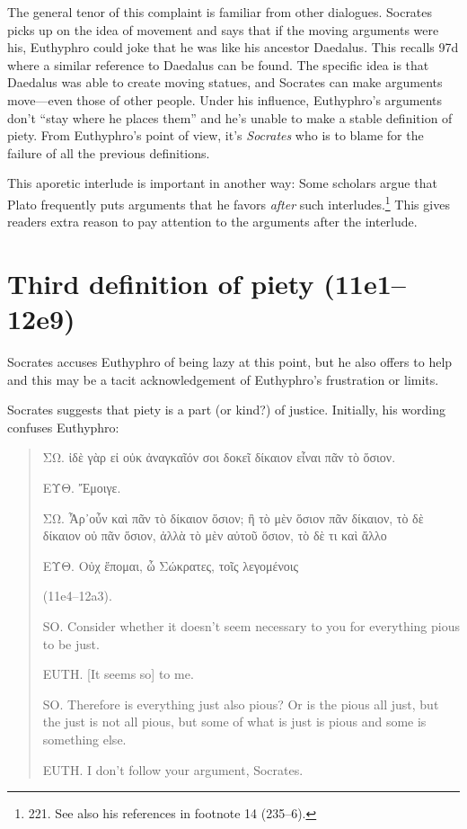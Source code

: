 \documentclass[11pt]{article}
\begin{document}
The general tenor of this complaint is familiar from other dialogues.  Socrates picks up on the idea of movement and says that if the moving arguments were his, Euthyphro could joke that he was like his ancestor Daedalus.  This recalls  97d where a similar reference to Daedalus can be found.  The specific idea is that Daedalus was able to create moving statues, and Socrates can make arguments move---even those of other people.  Under his influence, Euthyphro's arguments don't ``stay where he places them'' and he's unable to make a stable definition of piety.  From Euthyphro's point of view, it's \emph{Socrates} who is to blame for the failure of all the previous definitions.

This aporetic interlude is important in another way: Some scholars argue that Plato frequently puts arguments that he favors \emph{after} such interludes.\footnote{\citet{mcpherran1992} 221.  See also his references in footnote 14 (235--6).}  This gives readers extra reason to pay attention to the arguments after the interlude.


\section{Third definition of piety (11e1--12e9)}

Socrates accuses Euthyphro of being lazy at this point, but he also offers to help and this may be a tacit acknowledgement of Euthyphro's frustration or limits.

Socrates suggests that piety is a part (or kind?) of justice.  Initially, his wording confuses Euthyphro:

\begin{quote}

    {\g
    ΣΩ. ἰδὲ γὰρ εἰ οὐκ ἀναγκαῖόν σοι δοκεῖ δίκαιον εἶναι πᾶν τὸ ὅσιον.

    ΕΥΘ. Ἔμοιγε.

    ΣΩ. Ἆρ᾽οὖν καὶ πᾶν τὸ δίκαιον ὅσιον; ἢ τὸ μὲν ὅσιον πᾶν δίκαιον, τὸ δὲ δίκαιον οὐ πᾶν ὅσιον, ἀλλὰ τὸ μὲν αὐτοῦ ὅσιον, τὸ δὲ τι καὶ ἄλλο

    ΕΥΘ. Οὐχ ἕπομαι, ὦ Σώκρατες, τοῖς λεγομένοις
    } (11e4--12a3).

    SO. Consider whether it doesn't seem necessary to you for everything pious to be just.

    EUTH. [It seems so] to me.

    SO. Therefore is everything just also pious? Or is the pious all just, but the just is not all pious, but some of what is just is pious and some is something else.

    EUTH. I don't follow your argument, Socrates.

\end{quote}
\end{document}
